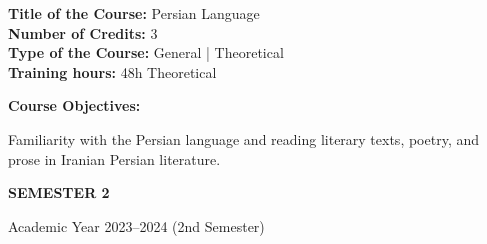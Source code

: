 \documentclass[12pt,a4paper]{article}
\begin{document}
\par\vspace{14pt}
\nopagebreak
\textbf{Title of the Course:} Persian Language\\
\textbf{Number of Credits:} 3\\
\textbf{Type of the Course:} General | Theoretical\\
\textbf{Training hours:} 48h Theoretical\par\vspace{4pt}
\textbf{Course Objectives:}\par\vspace{2pt}
Familiarity with the Persian language and reading literary texts, poetry, and prose in Iranian
Persian literature.\par\vspace{4pt}

\newpage
\vspace*{\fill}
\begin{center}
  {\fontsize{28pt}{34pt}\selectfont \textbf{SEMESTER 2}}\par\vspace{12pt}
  {\fontsize{13pt}{17pt}\selectfont Academic Year 2023–2024 (2nd Semester)}
\end{center}
\vspace*{\fill}
\end{document}
